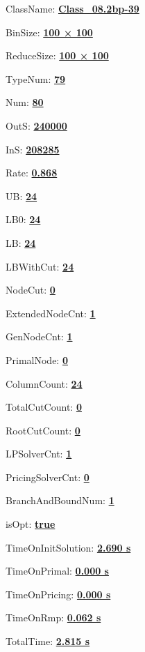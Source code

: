 \documentclass[11pt]{article}
\begin{document}
\pagestyle{empty}


ClassName: \underline{\textbf{Class_08.2bp-39}}
\par
BinSize: \underline{\textbf{100 × 100}}
\par
ReduceSize: \underline{\textbf{100 × 100}}
\par
TypeNum: \underline{\textbf{79}}
\par
Num: \underline{\textbf{80}}
\par
OutS: \underline{\textbf{240000}}
\par
InS: \underline{\textbf{208285}}
\par
Rate: \underline{\textbf{0.868}}
\par
UB: \underline{\textbf{24}}
\par
LB0: \underline{\textbf{24}}
\par
LB: \underline{\textbf{24}}
\par
LBWithCut: \underline{\textbf{24}}
\par
NodeCut: \underline{\textbf{0}}
\par
ExtendedNodeCnt: \underline{\textbf{1}}
\par
GenNodeCnt: \underline{\textbf{1}}
\par
PrimalNode: \underline{\textbf{0}}
\par
ColumnCount: \underline{\textbf{24}}
\par
TotalCutCount: \underline{\textbf{0}}
\par
RootCutCount: \underline{\textbf{0}}
\par
LPSolverCnt: \underline{\textbf{1}}
\par
PricingSolverCnt: \underline{\textbf{0}}
\par
BranchAndBoundNum: \underline{\textbf{1}}
\par
isOpt: \underline{\textbf{true}}
\par
TimeOnInitSolution: \underline{\textbf{2.690 s}}
\par
TimeOnPrimal: \underline{\textbf{0.000 s}}
\par
TimeOnPricing: \underline{\textbf{0.000 s}}
\par
TimeOnRmp: \underline{\textbf{0.062 s}}
\par
TotalTime: \underline{\textbf{2.815 s}}
\par
\newpage


\end{document}
